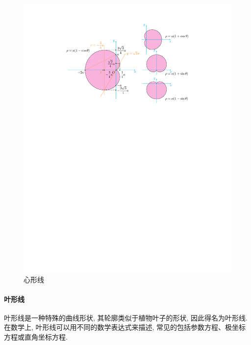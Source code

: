 \begin{figure}[H]
    \centering
    \includegraphics{figures/CardioidLine.pdf}
    \caption{心形线}
    \label{cardioidLine}
\end{figure}

\paragraph{叶形线}

叶形线是一种特殊的曲线形状, 其轮廓类似于植物叶子的形状, 因此得名为叶形线. 在数学上, 叶形线可以用不同的数学表达式来描述, 常见的包括参数方程、极坐标方程或直角坐标方程. 

